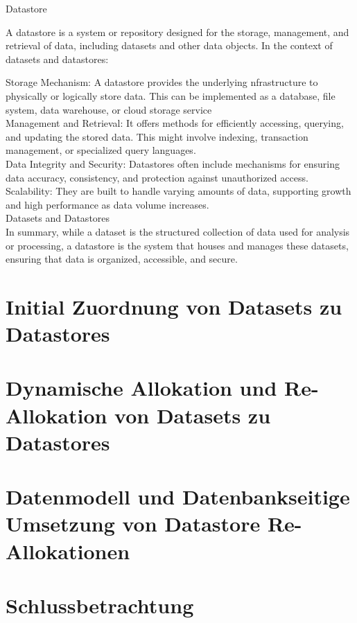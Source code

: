 Datastore

A datastore is a system or repository designed for the storage, management, and retrieval of data, including datasets and other data objects. In the context of datasets and datastores:

Storage Mechanism: A datastore provides the underlying nfrastructure to physically or logically store data. This can be implemented as a database, file system, data warehouse, or cloud storage service\newline
\\
    Management and Retrieval: It offers methods for efficiently accessing, querying, and updating the stored data. This might involve indexing, transaction management, or specialized query languages.
\\
    Data Integrity and Security: Datastores often include mechanisms for ensuring data accuracy, consistency, and protection against unauthorized access.
\\
    Scalability: They are built to handle varying amounts of data, supporting growth and high performance as data volume increases.
\\

Datasets and Datastores\\

In summary, while a dataset is the structured collection of data used for analysis or processing, a datastore is the system that houses and manages these datasets, ensuring that data is organized, accessible, and secure.

\chapter{Initial Zuordnung von Datasets zu Datastores}



\chapter{Dynamische Allokation und Re-Allokation von Datasets zu Datastores}



\chapter{Datenmodell und Datenbankseitige Umsetzung von Datastore Re-Allokationen}


\chapter{Schlussbetrachtung}